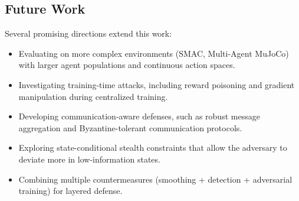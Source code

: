 \documentclass[12pt,a4paper]{article}
\begin{document}
\subsection{Future Work}

Several promising directions extend this work:

\begin{itemize}
    \item Evaluating on more complex environments (SMAC, Multi-Agent MuJoCo) with larger agent populations and continuous action spaces.
    \item Investigating training-time attacks, including reward poisoning and gradient manipulation during centralized training.
    \item Developing communication-aware defenses, such as robust message aggregation and Byzantine-tolerant communication protocols.
    \item Exploring state-conditional stealth constraints that allow the adversary to deviate more in low-information states.
    \item Combining multiple countermeasures (smoothing + detection + adversarial training) for layered defense.
\end{itemize}



\end{document}
